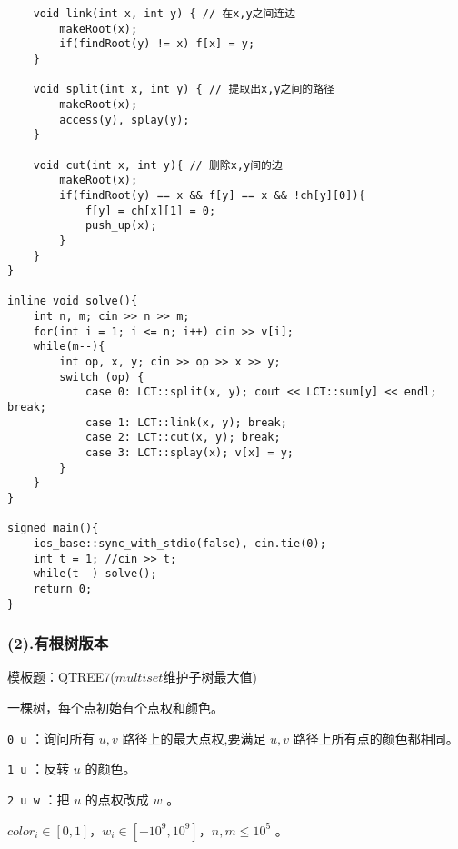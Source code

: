\documentclass[]{article}
\begin{document}
\begin{verbatim}
    void link(int x, int y) { // 在x,y之间连边
        makeRoot(x);
        if(findRoot(y) != x) f[x] = y;
    }
    
    void split(int x, int y) { // 提取出x,y之间的路径
        makeRoot(x);
        access(y), splay(y);
    }

    void cut(int x, int y){ // 删除x,y间的边
        makeRoot(x);
        if(findRoot(y) == x && f[y] == x && !ch[y][0]){
            f[y] = ch[x][1] = 0;
            push_up(x);
        }
    }
}

inline void solve(){
    int n, m; cin >> n >> m;
    for(int i = 1; i <= n; i++) cin >> v[i];
    while(m--){
        int op, x, y; cin >> op >> x >> y;
        switch (op) {
            case 0: LCT::split(x, y); cout << LCT::sum[y] << endl; break;
            case 1: LCT::link(x, y); break;
            case 2: LCT::cut(x, y); break;
            case 3: LCT::splay(x); v[x] = y;
        }
    }
}

signed main(){
    ios_base::sync_with_stdio(false), cin.tie(0);
    int t = 1; //cin >> t;
    while(t--) solve();
    return 0;
}
\end{verbatim}

\hypertarget{ux6709ux6839ux6811ux7248ux672c}{%
\subsubsection{(2).有根树版本}\label{ux6709ux6839ux6811ux7248ux672c}}

模板题：QTREE7(\(multiset\)维护子树最大值)

一棵树，每个点初始有个点权和颜色。

\texttt{0\ u} ：询问所有 \(u,v\) 路径上的最大点权,要满足 \(u,v\)
路径上所有点的颜色都相同。

\texttt{1\ u} ：反转 \(u\) 的颜色。

\texttt{2\ u\ w} ：把 \(u\) 的点权改成 \(w\) 。

\(color_i\in[0,1]\)，\(w_i\in[-10^9,10^9]\)，\(n,m\le10^5\) 。
\end{document}
